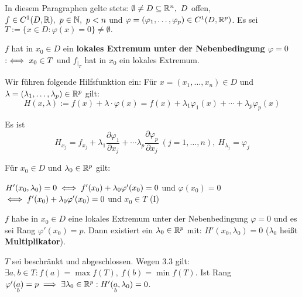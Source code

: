 \documentclass[a4paper,twoside,DIV15,BCOR12mm,chapterprefix=true,headings=twolinechapter]{scrbook}
\begin{document}
In diesem Paragraphen gelte stets: $\emptyset \ne D \subseteq \mathbb{R}^n,\ D$ offen, $f \in C^1(D,\MdR),\ p \in \MdN,\ p<n$ und $\varphi = (\varphi_1,\ldots,\varphi_p) \in C^1(D,\mathbb{R}^p)$. Es sei $T:=\{x\in D: \varphi(x) = 0\} \ne \emptyset.$

\begin{definition}
$f$ hat in $x_0\in D$ ein \textbf{lokales Extremum unter der Nebenbedingung $\varphi = 0$} $:\iff x_0 \in T$ und $f_{|_T}$ hat in $x_0$ ein lokales Extremum.
\end{definition}

Wir führen folgende Hilfsfunktion ein: Für $x=(x_1,\ldots,x_n) \in D$ und $\lambda = (\lambda_1,\ldots,\lambda_p) \in \mathbb{R}^p$ gilt: $$H(x,\lambda) := f(x) + \lambda\cdot\varphi(x) = f(x) + \lambda_1\varphi_1(x) + \cdots + \lambda_p\varphi_p(x)$$

Es ist $$H_{x_j} = f_{x_j} + \lambda_1\frac{\partial\varphi_1}{\partial x_j} + \cdots \lambda_p\frac{\partial\varphi_p}{\partial x_j}\ (j=1,\ldots,n),\ H_{\lambda_j} = \varphi_j$$

Für $x_0 \in D$ und $\lambda_0 \in \mathbb{R}^p$ gilt:

$H'(x_0,\lambda_0) = 0 \iff f'(x_0) + \lambda_0\varphi'(x_0) = 0$ und $\varphi(x_0) = 0$\\
$\iff f'(x_0) + \lambda_0\varphi'(x_0) = 0$ und $x_0 \in T$ (I)

\begin{satz}
$f$ habe in $x_0\in D$ eine lokales Extremum unter der Nebenbedingung $\varphi=0$ und es sei Rang $\varphi'(x_0) = p$. Dann existiert ein $\lambda_0 \in \mathbb{R}^p$ mit: $H'(x_0,\lambda_0) = 0$ ($\lambda_0$ heißt \textbf{Multiplikator}).
\end{satz}

\begin{folgerung}
$T$ sei beschränkt und abgeschlossen. Wegen 3.3 gilt: $\exists a,b \in T: f(a) = \max f(T),\ f(b) = \min f(T).$ Ist Rang $\varphi'(\underset{b}{a}) = p \implies \exists \lambda_0 \in \mathbb{R}^p: H'(\underset{b}{a},\lambda_0) = 0$.
\end{folgerung}
\end{document}
